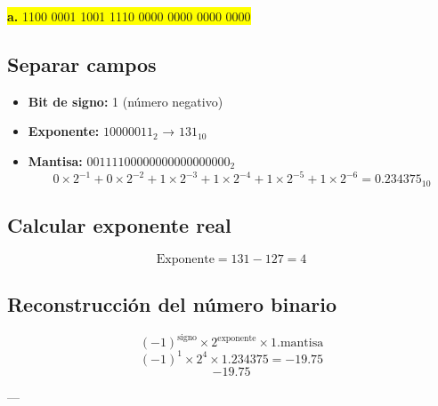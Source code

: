 \documentclass[a4paper,12pt]{article}
\begin{document}
	\begin{center}
	\colorbox{yellow}{\textbf{a.} 1100 0001 1001 1110 0000 0000 0000 0000}

	\subsection*{Separar campos}
	
	\begin{itemize}
		\item \textbf{Bit de signo:} 1 (número negativo)
		\item \textbf{Exponente:} $10000011_2$ → $131_{10}$
		\item \textbf{Mantisa:} $00111100000000000000000_2$ 
		\[
		0\times2^{-1} + 0\times2^{-2} + 1\times2^{-3} + 1\times2^{-4} + 1\times2^{-5} + 1\times2^{-6} = 0.234375_{10}
		\]
	\end{itemize}
	
	\subsection*{Calcular exponente real}
	
	\[
	\text{Exponente} = 131 - 127 = 4
	\]
	

		\vspace{-0.5cm}
	\subsection*{Reconstrucción del número binario}	
	\[
	(-1)^{\text{signo}} \times 2^{\text{exponente}} \times 1.\text{mantisa}
	\]
	\[
	(-1)^1 \times 2^4 \times 1.234375 = -19.75
	\]
	\vspace{1em}
	\[
	\boxed{-19.75}
	\]
	
	---
	\end{center}

		\newpage
		
\end{document}
